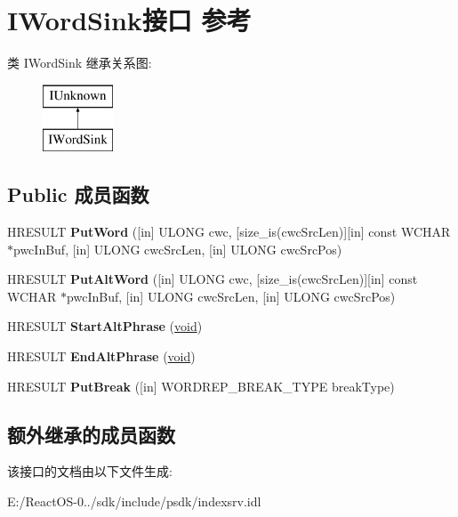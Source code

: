 \hypertarget{interface_i_word_sink}{}\section{I\+Word\+Sink接口 参考}
\label{interface_i_word_sink}
类 I\+Word\+Sink 继承关系图\+:\begin{figure}[H]
\begin{center}
\leavevmode
\includegraphics[height=2.000000cm]{interface_i_word_sink}
\end{center}
\end{figure}
\subsection*{Public 成员函数}
\begin{DoxyCompactItemize}
\item 
\mbox{\label{interface_i_word_sink_a2a87bd2d808b1ba69408a721a448d0e1}} 
H\+R\+E\+S\+U\+LT {\bfseries Put\+Word} (\mbox{[}in\mbox{]} U\+L\+O\+NG cwc, \mbox{[}size\+\_\+is(cwc\+Src\+Len)\mbox{]}\mbox{[}in\mbox{]} const W\+C\+H\+AR $\ast$pwc\+In\+Buf, \mbox{[}in\mbox{]} U\+L\+O\+NG cwc\+Src\+Len, \mbox{[}in\mbox{]} U\+L\+O\+NG cwc\+Src\+Pos)
\item 
\mbox{\label{interface_i_word_sink_abb855a8ec9fb7f3e19c837f744e4293c}} 
H\+R\+E\+S\+U\+LT {\bfseries Put\+Alt\+Word} (\mbox{[}in\mbox{]} U\+L\+O\+NG cwc, \mbox{[}size\+\_\+is(cwc\+Src\+Len)\mbox{]}\mbox{[}in\mbox{]} const W\+C\+H\+AR $\ast$pwc\+In\+Buf, \mbox{[}in\mbox{]} U\+L\+O\+NG cwc\+Src\+Len, \mbox{[}in\mbox{]} U\+L\+O\+NG cwc\+Src\+Pos)
\item 
\mbox{\label{interface_i_word_sink_a81aa017e6522a33117fedd28e86c1308}} 
H\+R\+E\+S\+U\+LT {\bfseries Start\+Alt\+Phrase} (\hyperlink{interfacevoid}{void})
\item 
\mbox{\label{interface_i_word_sink_a1c55dca3a312020ce4b90b8dd0dade19}} 
H\+R\+E\+S\+U\+LT {\bfseries End\+Alt\+Phrase} (\hyperlink{interfacevoid}{void})
\item 
\mbox{\label{interface_i_word_sink_a4cfd6eb72af4da5d068bc29e68af7692}} 
H\+R\+E\+S\+U\+LT {\bfseries Put\+Break} (\mbox{[}in\mbox{]} W\+O\+R\+D\+R\+E\+P\+\_\+\+B\+R\+E\+A\+K\+\_\+\+T\+Y\+PE break\+Type)
\end{DoxyCompactItemize}
\subsection*{额外继承的成员函数}


该接口的文档由以下文件生成\+:\begin{DoxyCompactItemize}
\item 
E\+:/\+React\+O\+S-\/0../sdk/include/psdk/indexsrv.\+idl\end{DoxyCompactItemize}

